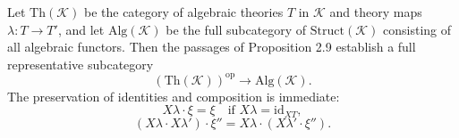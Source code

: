Let $\mathrm{Th}(\mathcal{K})$ be the category of algebraic theories $T$ in $\mathcal{K}$ and theory maps $\lambda: T \longrightarrow T'$, and let $\mathrm{Alg}(\mathcal{K})$ be the full subcategory of $\mathrm{Struct}(\mathcal{K})$ consisting of all algebraic functors. Then the passages of Proposition 2.9 establish a full representative subcategory
$$
(\mathrm{Th}(\mathcal{K}))^{\mathrm{op}} \longrightarrow \mathrm{Alg}(\mathcal{K}).
$$
The preservation of identities and composition is immediate:
$$
X\lambda \cdot \xi = \xi \quad \text{if } X\lambda = \mathrm{id}_{XT},
$$
$$
(X\lambda \cdot X\lambda') \cdot \xi'' = X\lambda \cdot (X\lambda' \cdot \xi'').
$$
